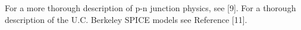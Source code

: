 %
%
For a more thorough description of p-n junction physics, see [9].  For a
thorough description of the U.C. Berkeley SPICE models see Reference [11].
